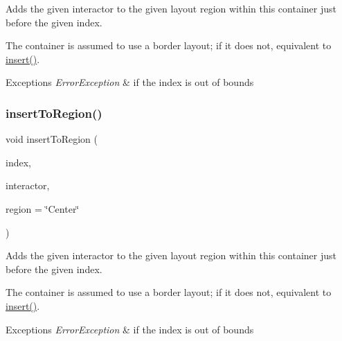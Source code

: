 Adds the given interactor to the given layout region within this container just before the given index. 

The container is assumed to use a border layout; if it does not, equivalent to \mbox{\hyperlink{classGContainer_afffb8f789ff9a8466fbae5b846a0ebe7}{insert()}}. 
\begin{DoxyExceptions}{Exceptions}
{\em Error\+Exception} & if the index is out of bounds \\
\hline
\end{DoxyExceptions}
\mbox{\label{classGContainer_ad4d413f64a3e4fb948956e7249c10110}} 
\subsubsection{\texorpdfstring{insert\+To\+Region()}{insertToRegion()}\hspace{0.1cm}{\footnotesize\ttfamily [4/4]}}
{\footnotesize\ttfamily void insert\+To\+Region (\begin{DoxyParamCaption}\item[{int}]{index,  }\item[{\mbox{\hyperlink{classGInteractor}{G\+Interactor}} \&}]{interactor,  }\item[{const std\+::string \&}]{region = {\ttfamily \char`\"{}Center\char`\"{}} }\end{DoxyParamCaption})\hspace{0.3cm}{\ttfamily [virtual]}}



Adds the given interactor to the given layout region within this container just before the given index. 

The container is assumed to use a border layout; if it does not, equivalent to \mbox{\hyperlink{classGContainer_afffb8f789ff9a8466fbae5b846a0ebe7}{insert()}}. 
\begin{DoxyExceptions}{Exceptions}
{\em Error\+Exception} & if the index is out of bounds \\
\hline
\end{DoxyExceptions}
\mbox{\label{classGObservable_aeec1adc19aa0f33de62390686ee1382c}} 
